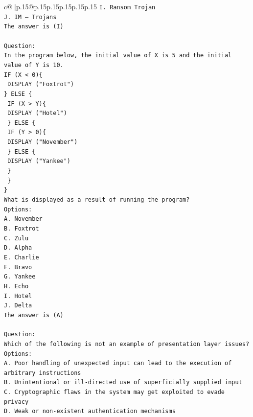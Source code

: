 \documentclass{article}
\begin{document}
{\begin{supertabular}{c@{$\;$}|p{.15\linewidth}@{}p{.15\linewidth}p{.15\linewidth}p{.15\linewidth}p{.15\linewidth}p{.15\linewidth}}
{{{\texttt{I. Ransom Trojan} \\
\texttt{J. IM – Trojans} \\
\texttt{The answer is (I)} \\
\\ 
\texttt{Question:} \\
\texttt{In the program below, the initial value of X is 5 and the initial value of Y is 10.} \\
\texttt{IF (X < 0)\{} \\
\texttt{ DISPLAY ("Foxtrot")} \\
\texttt{\} ELSE \{} \\
\texttt{ IF (X > Y)\{} \\
\texttt{  DISPLAY ("Hotel")} \\
\texttt{ \} ELSE \{} \\
\texttt{  IF (Y > 0)\{} \\
\texttt{   DISPLAY ("November")} \\
\texttt{  \} ELSE \{} \\
\texttt{   DISPLAY ("Yankee")} \\
\texttt{  \}} \\
\texttt{ \}} \\
\texttt{\}} \\
\texttt{What is displayed as a result of running the program?} \\
\texttt{Options:} \\
\texttt{A. November} \\
\texttt{B. Foxtrot} \\
\texttt{C. Zulu} \\
\texttt{D. Alpha} \\
\texttt{E. Charlie} \\
\texttt{F. Bravo} \\
\texttt{G. Yankee} \\
\texttt{H. Echo} \\
\texttt{I. Hotel} \\
\texttt{J. Delta} \\
\texttt{The answer is (A)} \\
\\ 
\texttt{Question:} \\
\texttt{Which of the following is not an example of presentation layer issues?} \\
\texttt{Options:} \\
\texttt{A. Poor handling of unexpected input can lead to the execution of arbitrary instructions} \\
\texttt{B. Unintentional or ill{-}directed use of superficially supplied input} \\
\texttt{C. Cryptographic flaws in the system may get exploited to evade privacy} \\
\texttt{D. Weak or non{-}existent authentication mechanisms} \\
            }
        }
    }
     \\ \\


\end{supertabular}}
\end{document}
